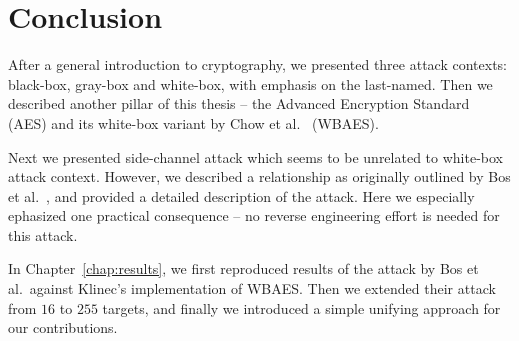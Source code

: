 \cleardoublepage{}

\chapter*{Conclusion}
\label{chap:concl}

After a general introduction to cryptography, we presented three attack contexts: black-box, gray-box and white-box, with emphasis on the last-named. Then we described another pillar of this thesis -- the Advanced Encryption Standard (AES) and its white-box variant by Chow et al.\ \cite{chow2002aes} (WBAES).

Next we presented side-channel attack which seems to be unrelated to white-box attack context. However, we described a relationship as originally outlined by Bos et al.\ \cite{bos2015differential}, and provided a detailed description of the attack. Here we especially ephasized one practical consequence -- no reverse engineering effort is needed for this attack.

In Chapter~\ref{chap:results}, we first reproduced results of the attack by Bos et al.\ against Klinec's implementation \cite{klinec2013implementation} of WBAES. Then we extended their attack from $16$ to $255$ targets, and finally we introduced a simple unifying approach for our contributions.

